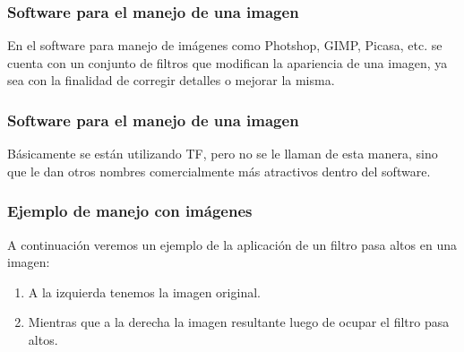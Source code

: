 \begin{frame}
\frametitle{Software para el manejo de una imagen}
En el software para manejo de imágenes como Photshop, GIMP, Picasa, etc. se cuenta con un conjunto de filtros que modifican la apariencia de una imagen, \pause ya sea con la finalidad de corregir detalles o mejorar la misma.
\end{frame}
\begin{frame}
\frametitle{Software para el manejo de una imagen}
Básicamente se están utilizando TF, \pause pero no se le llaman de esta manera, sino que le dan otros nombres comercialmente más atractivos dentro del software.
\end{frame}
\begin{frame}
\frametitle{Ejemplo de manejo con imágenes}
A continuación veremos un ejemplo de la aplicación de un filtro pasa altos en una imagen:
\pause
{}
\begin{enumerate}[<+->]
\item A la izquierda tenemos la imagen original.
\item Mientras que a la derecha la imagen resultante luego de ocupar el filtro pasa altos.
\end{enumerate}
\end{frame}
